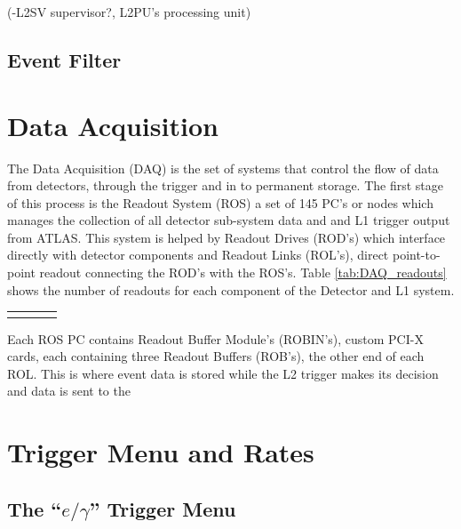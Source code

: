 		(-L2SV supervisor?, L2PU's processing unit)



	\subsection*{Event Filter}

	



\section{Data Acquisition}
\label{sec:trig_DAQ}

	The Data Acquisition (DAQ) is the set of systems that control the flow of data from detectors, through the trigger and in to permanent storage. The first stage of this process is the Readout System (ROS) a set of 145 PC's or nodes which manages the collection of all detector sub-system data and and L1 trigger output from ATLAS. This system is helped by Readout Drives (ROD's) which interface directly with detector components and Readout Links (ROL's), direct point-to-point readout connecting the ROD's with the ROS's. Table \ref{tab:DAQ_readouts} shows the number of readouts for each component of the Detector and L1 system.

	\begin{tabular}{ | l | c | c | c | }
		\hline

    	\hline
    	\label{tab:DAQ_readouts}
  	\end{tabular}

  	Each ROS PC contains Readout Buffer Module's (ROBIN's), custom PCI-X cards, each containing three Readout Buffers (ROB's), the other end of each ROL. This is where event data is stored while the L2 trigger makes its decision and data is sent to the 


\section{Trigger Menu and Rates}
\label{sec:trig_menu}

\subsection{The ``$e/\gamma$'' Trigger Menu} 














